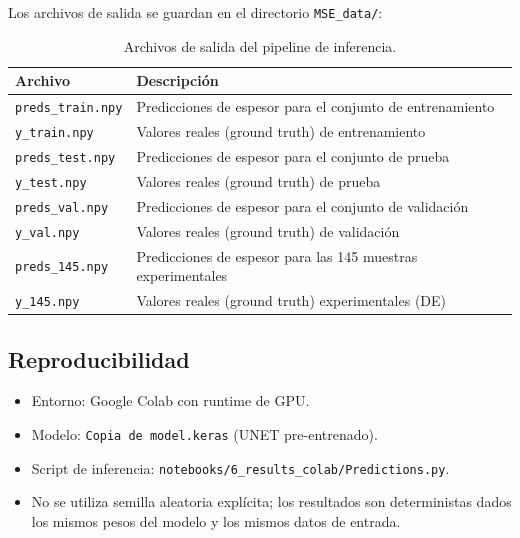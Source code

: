 \documentclass{article}
\begin{document}
Los archivos de salida se guardan en el directorio \texttt{MSE\_data/}:

\begin{table}[htbp]
\centering
\caption{Archivos de salida del pipeline de inferencia.}
\label{tab:inference-outputs}
\begin{tabular}{ll}
\hline
Archivo & Descripción \\
\hline
\texttt{preds\_train.npy} & Predicciones de espesor para el conjunto de entrenamiento \\
\texttt{y\_train.npy}    & Valores reales (ground truth) de entrenamiento \\
\texttt{preds\_test.npy}  & Predicciones de espesor para el conjunto de prueba \\
\texttt{y\_test.npy}      & Valores reales (ground truth) de prueba \\
\texttt{preds\_val.npy}   & Predicciones de espesor para el conjunto de validación \\
\texttt{y\_val.npy}       & Valores reales (ground truth) de validación \\
\texttt{preds\_145.npy}   & Predicciones de espesor para las 145 muestras experimentales \\
\texttt{y\_145.npy}       & Valores reales (ground truth) experimentales (DE) \\
\hline
\end{tabular}
\end{table}

\subsection{Reproducibilidad}
\begin{itemize}
\item Entorno: Google Colab con runtime de GPU.
\item Modelo: \texttt{Copia de model.keras} (UNET pre-entrenado).
\item Script de inferencia: \texttt{notebooks/6\_results\_colab/Predictions.py}.
\item No se utiliza semilla aleatoria explícita; los resultados son deterministas dados los mismos pesos del modelo y los mismos datos de entrada.
\end{itemize}

\newpage

\end{document}

